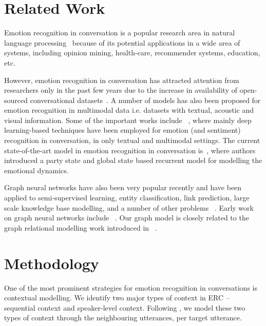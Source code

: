 \documentclass[11pt,a4paper]{article}
\begin{document}
\section{Related Work}
\label{sec:related-works}
Emotion recognition in conversation is a popular research area in natural language processing~\cite{kratzwald2018decision, colneric2018emotion} because of its potential applications in a wide area of systems, including opinion mining, health-care, recommender systems, education, etc. 

However, emotion recognition in conversation has attracted attention from researchers only in the past few years due to the increase in availability of open-sourced conversational datasets~\cite{chen2018emotionlines,zhou2018emotional,poria2018meld}. A number of models has also been proposed for emotion recognition in multimodal data i.e. datasets with textual, acoustic and visual information. Some of the important works include ~\citep{poria-EtAl:2017:Long,chen2017multimodal,AAAI1817341,zadatt,hazarika2018icon,hazarika-EtAl:2018:N18-1}, where mainly deep learning-based techniques have been employed for emotion (and sentiment) recognition in conversation, in only textual and multimodal settings. The current state-of-the-art model in emotion recognition in conversation is~\cite{dialoguernn}, where authors introduced a party state and global state based recurrent model for modelling the emotional dynamics.


Graph neural networks have also been very popular recently and have been applied to semi-supervised learning, entity classification, link prediction, large scale knowledge base modelling, and a number of other problems ~\cite{kipf2016semi,schlichtkrull2018modeling,bruna2013spectral}. Early work on graph neural networks include ~\cite{scarselli2008graph}. Our graph model is closely related to the graph relational modelling work introduced in ~\cite{schlichtkrull2018modeling}.

\section{Methodology}
\label{sec:method}

One of the most prominent strategies for emotion recognition in conversations is contextual modelling. We identify two major types of context in ERC -- sequential context and speaker-level context. Following \citet{poria-EtAl:2017:Long}, we model these two types of context through the neighbouring utterances, per target utterance.
\end{document}
